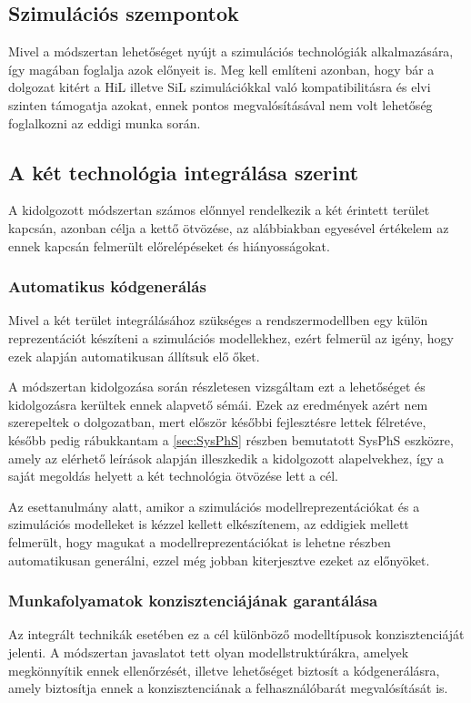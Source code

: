         \subsection{Szimulációs szempontok}
        Mivel a módszertan lehetőséget nyújt a szimulációs technológiák alkalmazására, így magában foglalja azok előnyeit is.
        Meg kell említeni azonban, hogy bár a dolgozat kitért a HiL illetve SiL szimulációkkal való kompatibilitásra és elvi szinten támogatja azokat, ennek pontos megvalósításával nem volt lehetőség foglalkozni az eddigi munka során.

        \subsection{A két technológia integrálása szerint}
        A kidolgozott módszertan számos előnnyel rendelkezik a két érintett terület kapcsán, azonban célja a kettő ötvözése, az alábbiakban egyesével értékelem az ennek kapcsán felmerült előrelépéseket és hiányosságokat.

            \subsubsection{Automatikus kódgenerálás}
            Mivel a két terület integrálásához szükséges a rendszermodellben egy külön reprezentációt készíteni a szimulációs modellekhez, ezért felmerül az igény, hogy ezek alapján automatikusan állítsuk elő őket.
            
            A módszertan kidolgozása során részletesen vizsgáltam ezt a lehetőséget és kidolgozásra kerültek ennek alapvető sémái. Ezek az eredmények azért nem szerepeltek o dolgozatban, mert először későbbi fejlesztésre lettek félretéve, később pedig rábukkantam a \ref{sec:SysPhS} részben bemutatott SysPhS
            eszközre, amely az elérhető leírások alapján illeszkedik a kidolgozott alapelvekhez, így a saját megoldás helyett a két technológia ötvözése lett a cél.
            
            Az esettanulmány alatt, amikor a szimulációs modellreprezentációkat és a szimulációs modelleket is kézzel kellett elkészítenem, az eddigiek mellett felmerült, hogy magukat a modellreprezentációkat is lehetne részben automatikusan generálni, ezzel még jobban kiterjesztve ezeket az előnyöket.

            \subsubsection{Munkafolyamatok konzisztenciájának garantálása}
            Az integrált technikák esetében ez a cél különböző modelltípusok konzisztenciáját jelenti. A módszertan javaslatot tett olyan modellstruktúrákra, amelyek megkönnyítik ennek ellenőrzését, illetve lehetőséget biztosít a kódgenerálásra, amely biztosítja ennek a konzisztenciának a felhasználóbarát megvalósítását is.
            

